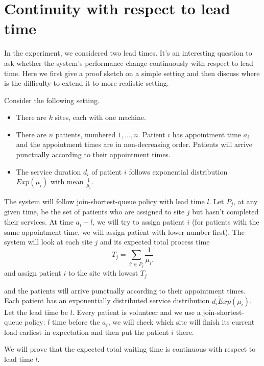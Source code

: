 \section{Continuity with respect to lead time}

In the experiment, we considered two lead times. It's an interesting question
to ask whether the system's performance change continuously with respect to
lead time. Here we first give a proof sketch on a simple setting and then discuss
where is the difficulty to extend it to more realistic setting.

Consider the following setting.
\begin{itemize}
\item There are $k$ sites, each with one machine.
\item There are $n$ patients, numbered $1,\ldots,n$. Patient $i$
      has appointment time $a_i$ and the appointment times are
      in non-decreasing order. Patients will arrive punctually
      according to their appointment times.
\item The service duration $d_i$ of patient $i$ follows exponential
      distribution $Exp(\mu_i)$ with mean $\frac{1}{\mu_i}$.
\end{itemize}
The system will follow join-shortest-queue policy with lead time $l$.
Let $P_j$, at any given time, be the set of patients who are assigned
to site $j$ but hasn't completed their services.
At time $a_i-l$, we will try to assign patient $i$ (for patients
with the same appointment time, we will assign patient with lower
number first). The system will look at each site $j$ and its
expected total process time
\[  T_j = \sum_{i' \in P_j} \frac{1}{\mu_{i'}}  \]
and assign patient $i$ to the site with lowest $T_j$

and the patients will arrive punctually according to their appointment times.
Each patient has an exponentially distributed service distribution $d_i \tilde Exp(\mu_i)$.
Let the lead time be $l$. Every patient is volunteer and we use a
join-shortest-queue policy: $l$ time before the $a_i$, we will check which site
will finish its current load earliest in expectation and then put the patient $i$ there.

We will prove that the expected total waiting time is continuous with
respect to lead time $l$.

